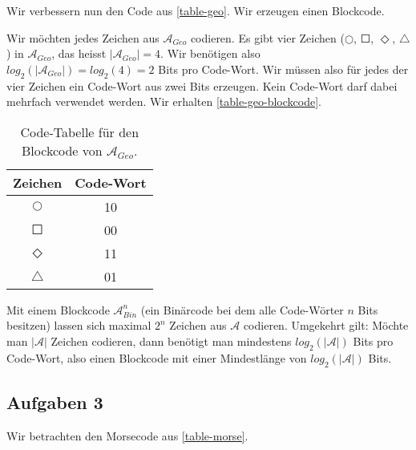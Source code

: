 Wir verbessern nun den Code aus \autoref{table-geo}. Wir erzeugen einen Blockcode.

\begin{table}[htb]
\centering
\begin{minipage}{0.6\textwidth}
\begin{example}
Wir möchten jedes Zeichen aus $\mathscr{A}_{Geo}$ codieren. Es gibt vier Zeichen ($\Circle$, $\Square$, $\Diamond$, $\triangle$) in $\mathscr{A}_{Geo}$, das heisst $|\mathscr{A}_{Geo}| = 4$. Wir benötigen also  $log_2(|\mathscr{A}_{Geo}|)=log_2(4)=2$ Bits pro Code-Wort. Wir müssen also für jedes der vier Zeichen ein Code-Wort aus zwei Bits erzeugen. Kein Code-Wort darf dabei mehrfach verwendet werden. Wir erhalten \autoref{table-geo-blockcode}.
\end{example}
\end{minipage}
\hfill
\begin{minipage}{0.35\textwidth}
\centering
\begin{tabular}{|c|c|}
\hline
Zeichen & Code-Wort \\ \hline
 $\Circle$       & 10         \\ \hline
 $\Square$       & 00        \\ \hline
 $\Diamond$       & 11         \\ \hline
 $\triangle$       & 01        \\ \hline
\end{tabular}
\caption{Code-Tabelle für den Blockcode von $\mathscr{A}_{Geo}$.}
\label{table-geo-blockcode}	
\end{minipage}
\end{table}

\begin{important}
Mit einem Blockcode $\mathscr{A}^n_{Bin}$ (ein Binärcode bei dem alle Code-Wörter $n$ Bits besitzen) lassen sich maximal $2^n$ Zeichen aus $\mathscr{A}$ codieren. Umgekehrt gilt: Möchte man $|\mathscr{A}|$ Zeichen codieren, dann benötigt man mindestens $log_2(|\mathscr{A}|)$ Bits pro Code-Wort, also einen Blockcode mit einer Mindestlänge von $log_2(|\mathscr{A}|)$ Bits.
\end{important}

\subsection{Aufgaben 3}

Wir betrachten den Morsecode aus \autoref{table-morse}.

